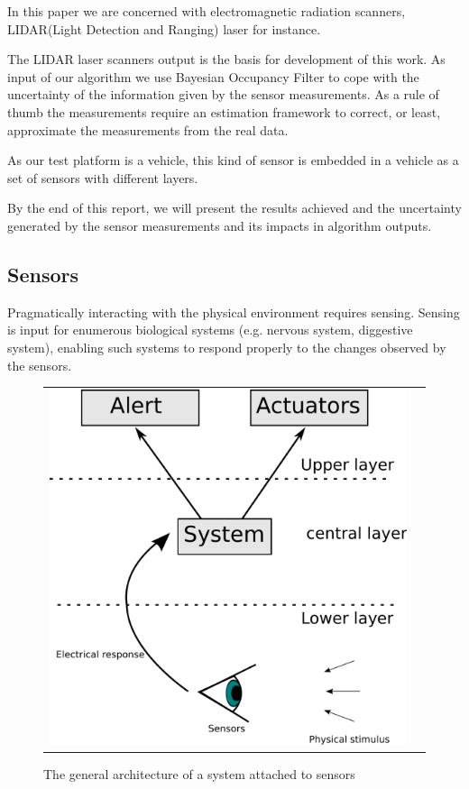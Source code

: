 In this paper we are concerned with electromagnetic radiation scanners, LIDAR(Light Detection and Ranging) laser for instance.

The LIDAR laser scanners output is the basis for development of this work. As input of our algorithm we use Bayesian Occupancy Filter \cite{TAY-2008-295084} to cope with the uncertainty of the information given by the sensor measurements. As a rule of thumb the measurements require an estimation framework to correct, or least, approximate the measurements from the real data.

As our test platform is a vehicle, this kind of sensor is embedded in a vehicle as a set of sensors with different layers.

By the end of this report, we will present the results achieved and the uncertainty generated by the sensor measurements and its impacts in algorithm outputs.


\subsection{Sensors}


Pragmatically interacting with the physical environment requires sensing. Sensing is input for enumerous biological systems (e.g. nervous system, diggestive system), enabling such systems to respond properly to the changes observed by the sensors. 

\begin{figure}[h]
   \centering
     \begin{tabular}{lr}
       \includegraphics[scale=0.45]{img/fig:sensors:role}
     \end{tabular}
   \caption{The general architecture of a system attached to sensors}
   \label{fig:sensors:role}
 \end{figure}

